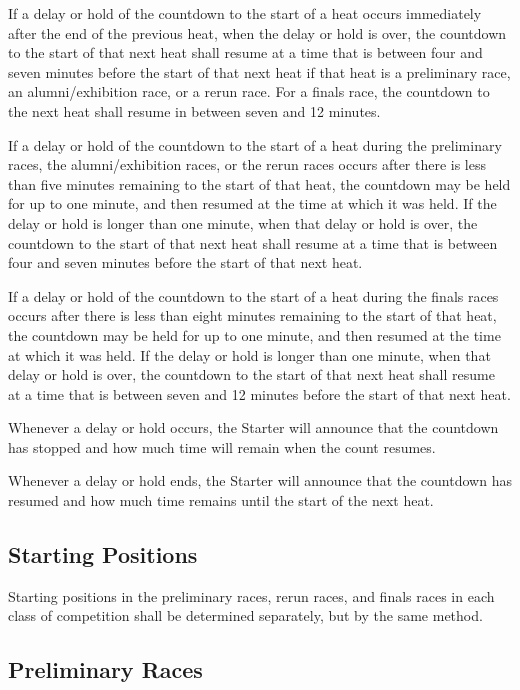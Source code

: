 \documentclass[openany]{book}
\begin{document}
If a delay or hold of the countdown to the start of a heat occurs immediately after the end of the previous heat, when the delay or hold is over, the countdown to the start of that next heat shall resume at a time that is between four and seven minutes before the start of that next heat if that heat is a preliminary race, an alumni/exhibition race, or a rerun race. For a finals race, the countdown to the next heat shall resume in between seven and 12 minutes.

If a delay or hold of the countdown to the start of a heat during the preliminary races, the alumni/exhibition races, or the rerun races occurs after there is less than five minutes remaining to the start of that heat, the countdown may be held for up to one minute, and then resumed at the time at which it was held. If the delay or hold is longer than one minute, when that delay or hold is over, the countdown to the start of that next heat shall resume at a time that is between four and seven minutes before the start of that next heat.

If a delay or hold of the countdown to the start of a heat during the finals races occurs after there is less than eight minutes remaining to the start of that heat, the countdown may be held for up to one minute, and then resumed at the time at which it was held. If the delay or hold is longer than one minute, when that delay or hold is over, the countdown to the start of that next heat shall resume at a time that is between seven and 12 minutes before the start of that next heat.

Whenever a delay or hold occurs, the Starter will announce that the countdown has stopped and how much time will remain when the count resumes.

Whenever a delay or hold ends, the Starter will announce that the countdown has resumed and how much time remains until the start of the next heat.

\subsection{Starting Positions}

Starting positions in the preliminary races, rerun races, and finals races in each class of competition shall be determined separately, but by the same method.

\subsection{Preliminary Races}
\end{document}
